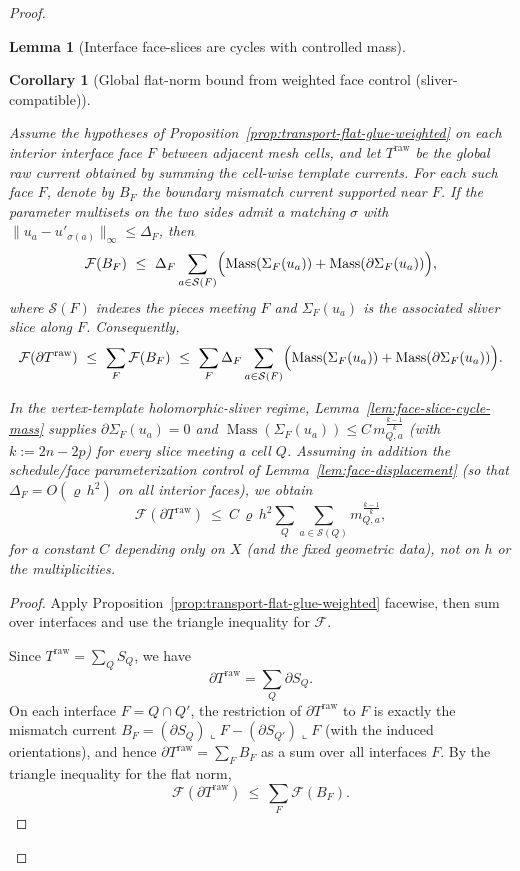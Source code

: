 \documentclass[11pt]{article}
\numberwithin{equation}{section}  %
\theoremstyle{plain}
\newtheorem{lemma}[theorem]{Lemma}
\newtheorem{corollary}[theorem]{Corollary}
\theoremstyle{definition}
\theoremstyle{remark}
\DeclareMathOperator{\Mass}{Mass}
\begin{document}
\begin{proof}
\begin{lemma}[{Interface face-slices are cycles with controlled mass}]
\end{lemma}


\begin{corollary}[Global flat-norm bound from weighted face control (sliver-compatible)]\label{cor:global-flat-weighted}

Assume the hypotheses of Proposition~\ref{prop:transport-flat-glue-weighted} on each interior interface face $F$ between adjacent mesh cells,
and let $T^{\mathrm{raw}}$ be the global raw current obtained by summing the cell-wise template currents.
For each such face $F$, denote by $B_F$ the boundary mismatch current supported near $F$.
If the parameter multisets on the two sides admit a matching $\sigma$ with
$\|u_a-u'_{\sigma(a)}\|_\infty\le \Delta_F$, then
\[
\mathcal F(B_F)\ \le\ \Delta_F \sum_{a\in \mathcal S(F)}\Bigl(\Mass(\Sigma_F(u_a))+\Mass(\partial\Sigma_F(u_a))\Bigr),
\]
where $\mathcal S(F)$ indexes the pieces meeting $F$ and $\Sigma_F(u_a)$ is the associated sliver slice along $F$.
Consequently,
\[
\mathcal F(\partial T^{\mathrm{raw}})\ \le\ \sum_F \mathcal F(B_F)
\ \le\ \sum_F \Delta_F \sum_{a\in \mathcal S(F)}\Bigl(\Mass(\Sigma_F(u_a))+\Mass(\partial\Sigma_F(u_a))\Bigr).
\]

In the vertex-template holomorphic-sliver regime, Lemma~\ref{lem:face-slice-cycle-mass} supplies
$\partial\Sigma_F(u_a)=0$ and $\Mass(\Sigma_F(u_a))\le C\, m_{Q,a}^{\frac{k-1}{k}}$ (with $k:=2n-2p$)
for every slice meeting a cell $Q$.
Assuming in addition the schedule/face parameterization control of Lemma~\ref{lem:face-displacement} (so that $\Delta_F=O(\varrho\,h^2)$ on all interior faces),
we obtain
\[
\mathcal F(\partial T^{\mathrm{raw}})\ \le\ C\,\varrho\, h^2 \sum_Q \sum_{a\in \mathcal S(Q)} m_{Q,a}^{\frac{k-1}{k}},
\]
for a constant $C$ depending only on $X$ (and the fixed geometric data), not on $h$ or the multiplicities.

\end{corollary}

\begin{proof}
Apply Proposition~\ref{prop:transport-flat-glue-weighted} facewise, then sum over interfaces and use the triangle inequality for $\mathcal F$.

Since $T^{\mathrm{raw}}=\sum_Q S_Q$, we have
\[
\partial T^{\mathrm{raw}}=\sum_Q \partial S_Q.
\]
On each interface $F=Q\cap Q'$, the restriction of $\partial T^{\mathrm{raw}}$ to $F$ is exactly the mismatch current
\(
B_F=(\partial S_Q)\llcorner F-(\partial S_{Q'})\llcorner F
\)
(with the induced orientations), and hence
\(
\partial T^{\mathrm{raw}}=\sum_F B_F
\)
as a sum over all interfaces $F$.
By the triangle inequality for the flat norm,
\[
\mathcal F(\partial T^{\mathrm{raw}})
\ \le\
\sum_F \mathcal F(B_F).
\]


\end{proof}
\end{proof}
\end{document}
